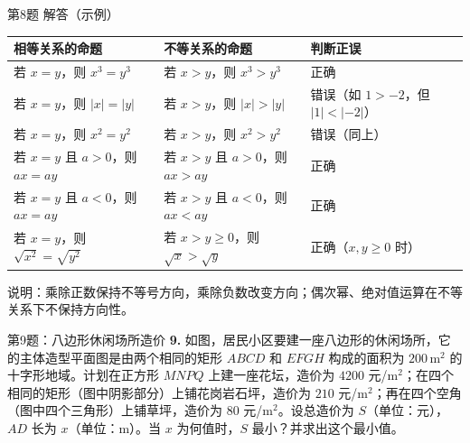 \documentclass[10pt,aspectratio=169,serif]{beamer}
\begin{document}
\begin{frame}[t]{第8题 解答（示例）}
\begin{tcolorbox}[colback=orange!10,colframe=orange,title=\textbf{参考答案}]
\begin{tabular}{p{4cm}|p{4.5cm}|p{2cm}}
\textbf{相等关系的命题} & \textbf{不等关系的命题} & \textbf{判断正误}\\
\hline
若 $x=y$，则 $x^{3}=y^{3}$ & 若 $x>y$，则 $x^{3}>y^{3}$ & 正确 \\
若 $x=y$，则 $|x|=|y|$ & 若 $x>y$，则 $|x|>|y|$ & 错误（如 $1>-2$，但 $|1|<|-2|$）\\
若 $x=y$，则 $x^{2}=y^{2}$ & 若 $x>y$，则 $x^{2}>y^{2}$ & 错误（同上）\\
若 $x=y$ 且 $a>0$，则 $ax=ay$ & 若 $x>y$ 且 $a>0$，则 $ax>ay$ & 正确 \\
若 $x=y$ 且 $a<0$，则 $ax=ay$ & 若 $x>y$ 且 $a<0$，则 $ax<ay$ & 正确 \\
若 $x=y$，则 $\sqrt{x^{2}}=\sqrt{y^{2}}$ & 若 $x>y\ge 0$，则 $\sqrt{x}>\sqrt{y}$ & 正确（$x,y\ge 0$ 时）\\
\end{tabular}
\vspace{0.5em}
{\small 说明：乘除正数保持不等号方向，乘除负数改变方向；偶次幂、绝对值运算在不等关系下不保持方向性。}
\end{tcolorbox}
\end{frame}

\begin{frame}[t]{第9题：八边形休闲场所造价}
\textbf{9.} 如图，居民小区要建一座八边形的休闲场所，它的主体造型平面图是由两个相同的矩形 $ABCD$ 和 $EFGH$ 构成的面积为 $200\,\text{m}^{2}$ 的十字形地域。计划在正方形 $MNPQ$ 上建一座花坛，造价为 $4200$ 元/$\text{m}^{2}$；在四个相同的矩形（图中阴影部分）上铺花岗岩石坪，造价为 $210$ 元/$\text{m}^{2}$；再在四个空角（图中四个三角形）上铺草坪，造价为 $80$ 元/$\text{m}^{2}$。设总造价为 $S$（单位：元），$AD$ 长为 $x$（单位：$\text{m}$）。当 $x$ 为何值时，$S$ 最小？并求出这个最小值。
\end{frame}
\end{document}
